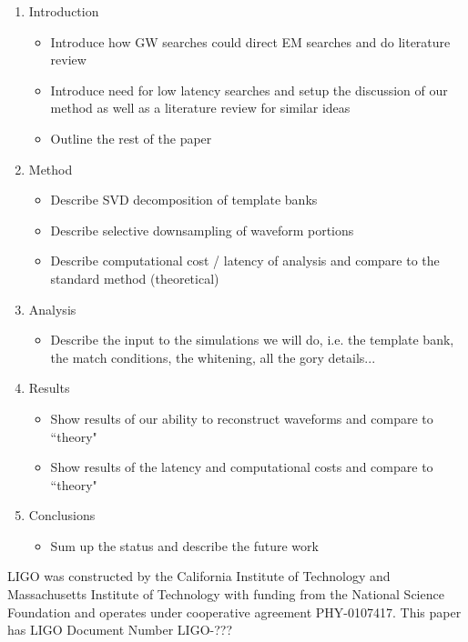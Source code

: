 \documentclass[aps,prd,showpacs,groupedaddress,showkeys,preprintnumbers]{revtex4}
\begin{document}
\begin{enumerate}
\item{Introduction}
\begin{itemize}
\item{Introduce how GW searches could direct EM searches and do literature review}
\item{Introduce need for low latency searches and setup the discussion of our
method as well as a literature review for similar ideas}
\item{Outline the rest of the paper}
\end{itemize}
\item{Method}
\begin{itemize}
\item{Describe SVD decomposition of template banks}
\item{Describe selective downsampling of waveform portions}
\item{Describe computational cost / latency of analysis and compare to the 
standard method (theoretical)}
\end{itemize}
\item{Analysis}
\begin{itemize}
\item{Describe the input to the simulations we will do, i.e. the template bank,
the match conditions, the whitening, all the gory details...}
\end{itemize}
\item{Results}
\begin{itemize}
\item{Show results of our ability to reconstruct waveforms and compare to 
``theory"}
\item{Show results of the latency and computational costs and compare to ``theory"}
\end{itemize}
\item{Conclusions}
\begin{itemize}
\item{Sum up the status and describe the future work}
\end{itemize}
\end{enumerate}
\begin{acknowledgments}
LIGO was constructed by the California Institute of Technology and Massachusetts Institute of Technology with funding from the National Science Foundation and operates under cooperative agreement PHY-0107417. This paper has LIGO Document Number LIGO-???
\end{acknowledgments}
\end{document}
